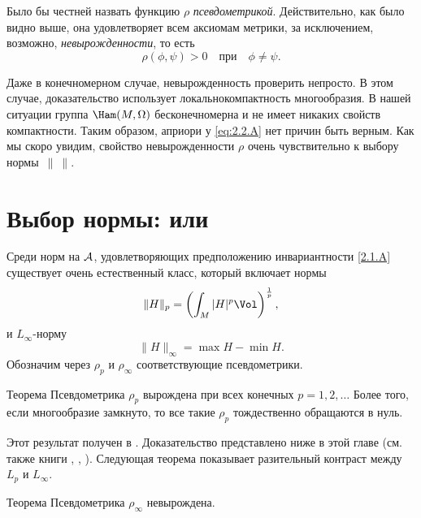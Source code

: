 Было бы честней назвать функцию $\rho$ \emph{псевдометрикой}.
Действительно, как было видно выше, она удовлетворяет всем аксиомам метрики, за исключением, возможно, {}\emph{невырожденности}, то есть 
\begin{equation}
\rho (\phi, \psi)> 0
\quad\text{при}\quad
\phi \ne \psi.
\label{eq:2.2.A}
\end{equation}

Даже в конечномерном случае, невырожденность проверить непросто.
В этом случае, доказательство использует локальнокомпактность многообразия.
В нашей ситуации группа $\Ham (M, \Omega)$ бесконечномерна и не имеет никаких свойств компактности.
Таким образом, априори у \ref{eq:2.2.A} нет причин быть верным.
Как мы скоро увидим, свойство невырожденности $\rho$ очень чувствительно к выбору нормы~$\|\ \|$.

\section[\texorpdfstring{Выбор нормы: $L_p$ или $L_\infty$}{Выбор нормы: Lₚ или L∞}]{Выбор нормы:  или }

Среди норм на $\mathcal{A}$, удовлетворяющих предположению инвариантности
\ref{2.1.A} существует очень естественный класс, который включает
нормы \?{$L_p$, $p = 1, 2, 3,\dots$}{Почему только целые $p$. Не лучше
было бы написать $p\in[1,\infty)$?. То же и в теореме.}
\[\|H\|_p=\left(\int_M|H|^p\Vol\right)^{\frac1p},\]
и $L_\infty$-норму 
\[\|H\|_\infty = \max H - \min H.\]
Обозначим через $\rho_p$ и $\rho_\infty$ соответствующие псевдометрики.

\begin{thm}{Теорема}\label{2.3.A}
Псевдометрика $\rho_p$ вырождена при всех конечных $p = 1, 2,\dots$
Более того, если многообразие замкнуто, то все такие $\rho_p$ тождественно обращаются в нуль.
\end{thm}

Этот результат получен в \cite{EP}.
Доказательство представлено ниже в этой главе (см. также книги \cite{HZ}, \cite{MS}, \cite{AK}).
Следующая теорема показывает разительный контраст между $L_p$ и $L_\infty$.

\begin{thm}{Теорема}\label{2.3.B}
Псевдометрика $\rho_\infty$ невырождена.
\end{thm}


